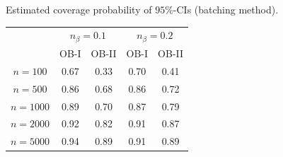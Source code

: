 
\begin{table}[]
\TABLE
\centering
{Estimated coverage probability of $95\%$-CIs (batching method).\label{tab.coverage_batch}}{
\hspace{5mm}
\begin{tabular*}{0.75\textwidth}{@{\extracolsep{\fill}}ccccc}\toprule
 & \multicolumn{2}{c}{$n_\beta=0.1$} & \multicolumn{2}{c}{$n_\beta=0.2$} \\
 & OB-I & OB-II & OB-I & OB-II \\\hline
$n=100$ & 0.67 & 0.33 & 0.70 & 0.41 \\
$n=500$ & 0.86 & 0.68 & 0.86 & 0.72 \\
$n=1000$ & 0.89 & 0.70 & 0.87 & 0.79 \\
$n=2000$ & 0.92 & 0.82 & 0.91 & 0.87 \\
$n=5000$ & 0.94 & 0.89 & 0.91 & 0.89 \\\bottomrule
\end{tabular*}
}{}
\end{table}